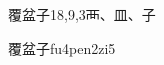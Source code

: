 \begin{entry}{覆盆子}{18,9,3}{⾑、⽫、⼦}
  \begin{phonetics}{覆盆子}{fu4pen2zi5}
  \end{phonetics}
\end{entry}
